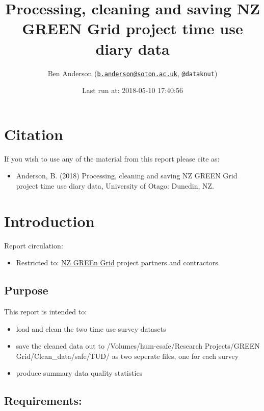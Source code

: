 \documentclass[]{article}
\title{Processing, cleaning and saving NZ GREEN Grid project time use diary
data}
\author{Ben Anderson
(\href{mailto:b.anderson@soton.ac.uk}{\nolinkurl{b.anderson@soton.ac.uk}},
\texttt{@dataknut})}
\date{Last run at: 2018-05-10 17:40:56}
\providecommand{\tightlist}{%
  \setlength{\itemsep}{0pt}\setlength{\parskip}{0pt}}
\begin{document}
\maketitle

{
\setcounter{tocdepth}{2}
\tableofcontents
}
\newpage

\section{Citation}\label{citation}

If you wish to use any of the material from this report please cite as:

\begin{itemize}
\tightlist
\item
  Anderson, B. (2018) Processing, cleaning and saving NZ GREEN Grid
  project time use diary data, University of Otago: Dunedin, NZ.
\end{itemize}

\newpage

\section{Introduction}\label{introduction}

Report circulation:

\begin{itemize}
\tightlist
\item
  Restricted to:
  \href{https://www.otago.ac.nz/centre-sustainability/research/energy/otago050285.html}{NZ
  GREEn Grid} project partners and contractors.
\end{itemize}

\subsection{Purpose}\label{purpose}

This report is intended to:

\begin{itemize}
\tightlist
\item
  load and clean the two time use survey datasets
\item
  save the cleaned data out to /Volumes/hum-csafe/Research
  Projects/GREEN Grid/Clean\_data/safe/TUD/ as two seperate files, one
  for each survey
\item
  produce summary data quality statistics
\end{itemize}

\subsection{Requirements:}\label{requirements}
\end{document}
